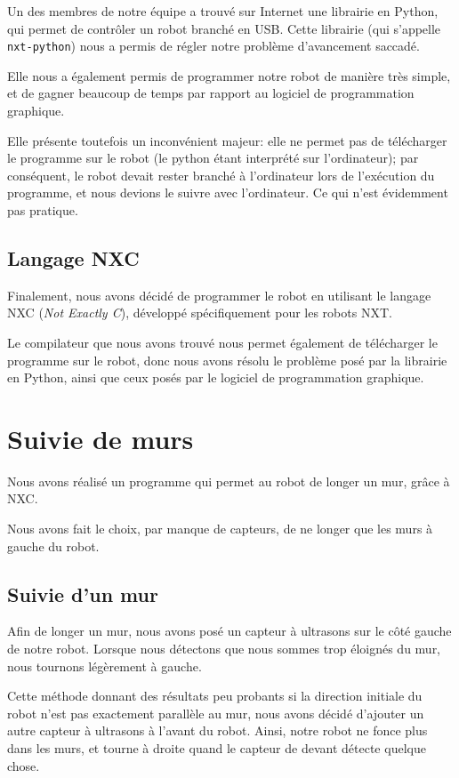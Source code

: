 \documentclass{scrartcl}
\begin{document}
Un des membres de notre équipe a trouvé sur Internet une librairie en
Python, qui permet de contrôler un robot branché en USB. Cette
librairie (qui s'appelle \texttt{nxt-python}) nous a permis de régler
notre problème d'avancement saccadé.

Elle nous a également permis de programmer notre robot de manière très
simple, et de gagner beaucoup de temps par rapport au logiciel de
programmation graphique.

Elle présente toutefois un inconvénient majeur: elle ne permet pas de télécharger
le programme sur le robot (le python étant interprété sur l'ordinateur);
par conséquent, le robot devait rester branché à l'ordinateur lors de
l'exécution du programme, et nous devions le suivre avec l'ordinateur. Ce qui
n'est évidemment pas pratique.

\subsection{Langage NXC}

Finalement, nous avons décidé de programmer le robot en utilisant le
langage NXC (\emph{Not Exactly C}), développé spécifiquement pour
les robots NXT.

Le compilateur que nous avons trouvé nous permet également de
télécharger le programme sur le robot, donc nous avons résolu le
problème posé par la librairie en Python, ainsi que ceux posés par le
logiciel de programmation graphique.

\section{Suivie de murs}

Nous avons réalisé un programme qui permet au robot de longer un mur, grâce
à NXC.

Nous avons fait le choix, par manque de capteurs, de ne longer que les murs à
gauche du robot.

\subsection{Suivie d'un mur}

Afin de longer un mur, nous avons posé un capteur à ultrasons sur le
côté gauche de notre robot. Lorsque nous détectons que nous sommes
trop éloignés du mur, nous tournons légèrement à gauche.

Cette méthode donnant des résultats peu probants si la direction
initiale du robot n'est pas exactement parallèle au mur, nous avons
décidé d'ajouter un autre capteur à ultrasons à l'avant du robot. Ainsi,
notre robot ne fonce plus dans les murs, et tourne à droite quand le
capteur de devant détecte quelque chose.
\end{document}
